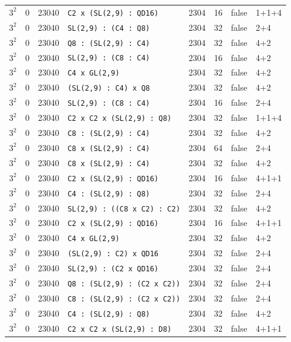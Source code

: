 \begin{longtable}{llrlrrll}
$3^2$ & 0 & 23040 & \texttt{C2 x (SL(2,9) : QD16)} & 2304 & 16 & false & 1+1+4\\
$3^2$ & 0 & 23040 & \texttt{SL(2,9) : (C4 : Q8)} & 2304 & 32 & false & 2+4\\
$3^2$ & 0 & 23040 & \texttt{Q8 : (SL(2,9) : C4)} & 2304 & 32 & false & 4+2\\
$3^2$ & 0 & 23040 & \texttt{SL(2,9) : (C8 : C4)} & 2304 & 16 & false & 4+2\\
$3^2$ & 0 & 23040 & \texttt{C4 x GL(2,9)} & 2304 & 32 & false & 4+2\\
$3^2$ & 0 & 23040 & \texttt{(SL(2,9) : C4) x Q8} & 2304 & 32 & false & 4+2\\
$3^2$ & 0 & 23040 & \texttt{SL(2,9) : (C8 : C4)} & 2304 & 16 & false & 2+4\\
$3^2$ & 0 & 23040 & \texttt{C2 x C2 x (SL(2,9) : Q8)} & 2304 & 32 & false & 1+1+4\\
$3^2$ & 0 & 23040 & \texttt{C8 : (SL(2,9) : C4)} & 2304 & 32 & false & 4+2\\
$3^2$ & 0 & 23040 & \texttt{C8 x (SL(2,9) : C4)} & 2304 & 64 & false & 2+4\\
$3^2$ & 0 & 23040 & \texttt{C8 x (SL(2,9) : C4)} & 2304 & 32 & false & 4+2\\
$3^2$ & 0 & 23040 & \texttt{C2 x (SL(2,9) : QD16)} & 2304 & 16 & false & 4+1+1\\
$3^2$ & 0 & 23040 & \texttt{C4 : (SL(2,9) : Q8)} & 2304 & 32 & false & 2+4\\
$3^2$ & 0 & 23040 & \texttt{SL(2,9) : ((C8 x C2) : C2)} & 2304 & 32 & false & 4+2\\
$3^2$ & 0 & 23040 & \texttt{C2 x (SL(2,9) : QD16)} & 2304 & 16 & false & 4+1+1\\
$3^2$ & 0 & 23040 & \texttt{C4 x GL(2,9)} & 2304 & 32 & false & 4+2\\
$3^2$ & 0 & 23040 & \texttt{(SL(2,9) : C2) x QD16} & 2304 & 32 & false & 2+4\\
$3^2$ & 0 & 23040 & \texttt{SL(2,9) : (C2 x QD16)} & 2304 & 32 & false & 2+4\\
$3^2$ & 0 & 23040 & \texttt{Q8 : (SL(2,9) : (C2 x C2))} & 2304 & 32 & false & 2+4\\
$3^2$ & 0 & 23040 & \texttt{C8 : (SL(2,9) : (C2 x C2))} & 2304 & 32 & false & 2+4\\
$3^2$ & 0 & 23040 & \texttt{C4 : (SL(2,9) : Q8)} & 2304 & 32 & false & 4+2\\
$3^2$ & 0 & 23040 & \texttt{C2 x C2 x (SL(2,9) : D8)} & 2304 & 32 & false & 4+1+1\\

\end{longtable}
